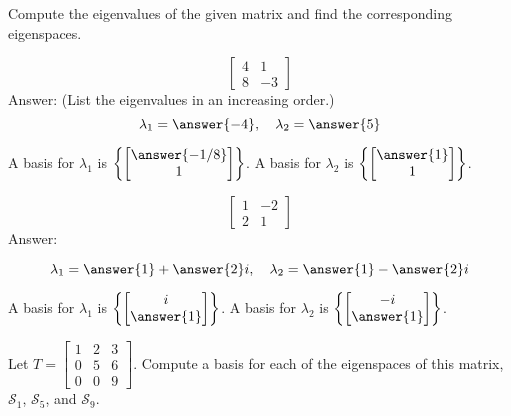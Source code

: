 \documentclass{ximera}
\begin{document}
\begin{problem}
Compute the eigenvalues of the given matrix and find the corresponding eigenspaces.
\begin{problem}
$$\begin{bmatrix}4&1\\8&-3\end{bmatrix}$$
Answer:
(List the eigenvalues in an increasing order.)
$$\lambda_1=\answer{-4},\quad\lambda_2=\answer{5}$$

A basis for $\lambda_1$ is $\left\{\begin{bmatrix}\answer{-1/8}\\1\end{bmatrix}\right\}$.  A basis for $\lambda_2$ is $\left\{\begin{bmatrix}\answer{1}\\1\end{bmatrix}\right\}$.
\end{problem}
\begin{problem}
$$\begin{bmatrix}1&-2\\2&1\end{bmatrix}$$
Answer:

$$\lambda_1=\answer{1}+\answer{2}i,\quad\lambda_2=\answer{1}-\answer{2}i$$

A basis for $\lambda_1$ is $\left\{\begin{bmatrix}i\\\answer{1}\end{bmatrix}\right\}$.  A basis for $\lambda_2$ is $\left\{\begin{bmatrix}-i\\\answer{1}\end{bmatrix}\right\}$.
\end{problem}
\end{problem}

\begin{problem}\label{prob:3x3tri_ev}
Let $T=\begin{bmatrix} 1 & 2 & 3\\ 0 & 5 & 6\\ 0 & 0 & 9\end{bmatrix}$.  Compute a basis for each of the eigenspaces of this matrix, $\mathcal{S}_1$, $\mathcal{S}_5$, and $\mathcal{S}_9$.
\end{problem}
\end{document}
